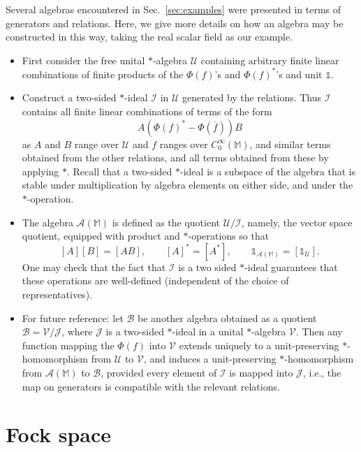 \documentclass[12pt,a4paper]{article}
\newcommand{\1}{\mathds{1}}                         %
\newcommand{\MM}{\mathbb{M}}
\newcommand{\II}{{\mathbb{1}}}
\newcommand{\Ac}{{\mathcal{A}}}
\newcommand{\Bc}{{\mathcal{B}}}
\newcommand{\Ic}{{\mathcal{I}}}
\newcommand{\Jc}{{\mathcal{J}}}
\newcommand{\Uc}{{\mathcal{U}}}
\newcommand{\Vc}{{\mathcal{V}}}
\newcommand{\CoinX}[1]{C_0^\infty(#1)}
\begin{document}
Several algebras encountered in Sec.~\ref{sec:examples} were presented in terms of generators and relations. Here, we give more details on how an algebra may be constructed in this way, taking the real scalar field as our example. 
		\begin{itemize}
			\item First consider the free unital $*$-algebra $\Uc$ containing arbitrary finite linear combinations of finite products of the $\Phi(f)$'s and $\Phi(f)^*$'s and unit $\II$.
			\item Construct a two-sided $*$-ideal $\Ic$ in $\Uc$ generated by the relations. 
			Thus $\mathcal{I}$ contains all finite linear combinations of terms of the form
			\[
			A(\Phi(f)^*-\Phi(\overline{f}))B 
			\] 
			as $A$ and $B$ range over $\Uc$ and $f$ ranges over $\CoinX{\MM}$, and similar terms obtained from the other relations, and all terms obtained from these by applying $*$. Recall that a two-sided $*$-ideal is a subspace of the algebra that is stable under multiplication by algebra elements on either side, and under the $*$-operation.
			\item The algebra $\Ac(\MM)$ is defined as the quotient $\Uc/\Ic$, namely, the vector space quotient, equipped with product and $*$-operations so that
			\[ 
			[A] [B]= [AB],\qquad [A]^*=[A^*], \qquad \II_{\Ac(\MM)} = [\II_\Uc].
			\]
			One may check that the fact that $\Ic$ is a two sided $*$-ideal guarantees that these operations are well-defined (independent of the choice of representatives).
			
			\item For future reference: let $\Bc$ be another algebra obtained as a quotient $\Bc=\Vc/\Jc$, where $\Jc$ is a two-sided $*$-ideal in a unital $*$-algebra $\Vc$. Then
			any function mapping the $\Phi(f)$ into $\Vc$ extends uniquely to a unit-preserving $*$-homomorphism from $\Uc$ to $\Vc$, and induces a unit-preserving $*$-homomorphism from $\Ac(\MM)$ to $\Bc$, provided every element of $\Ic$ is mapped into $\Jc$, i.e., the map on generators is compatible with the relevant relations.
		\end{itemize}

\section{Fock space}\label{sec:Fock}
\end{document}
